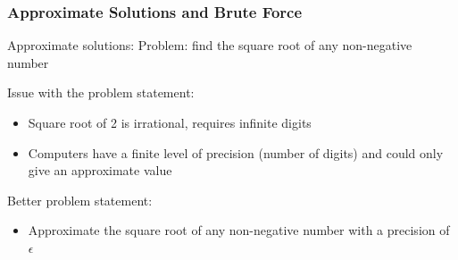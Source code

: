 \documentclass{beamer}
\begin{document}
\begin{frame}	
	\frametitle{Approximate Solutions and Brute Force}
	
	\begin{alertblock}{Approximate solutions:}
		Problem: find the square root of any non-negative number
		
		\vspace{10pt}
		
		Issue with the problem statement:
		\begin{itemize}
			\item Square root of 2 is irrational, requires infinite digits
			\item Computers have a finite level of precision (number of digits) and could only give an approximate value
		\end{itemize}
		
		\vspace{10pt}
		
		Better problem statement:
		\begin{itemize}
			\item Approximate the square root of any non-negative number with a precision of $\epsilon$
		\end{itemize}
	\end{alertblock}
	
\end{frame}
\end{document}

